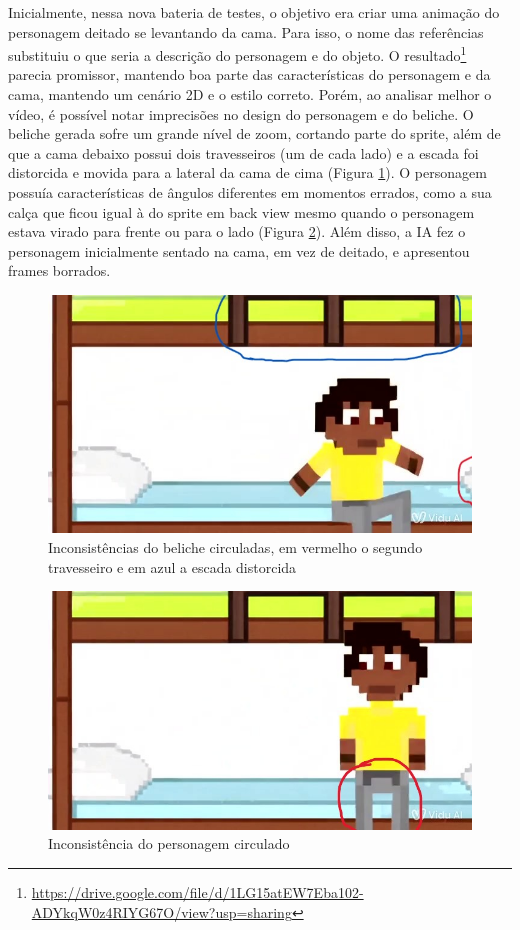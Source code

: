 Inicialmente, nessa nova bateria de testes, o objetivo era criar uma animação do personagem deitado se levantando da cama. Para isso, o nome das referências substituiu o que seria a descrição do personagem e do objeto. O resultado\footnote{\url{https://drive.google.com/file/d/1LG15atEW7Eba102-ADYkqW0z4RIYG67O/view?usp=sharing}} parecia promissor, mantendo boa parte das características do personagem e da cama, mantendo um cenário 2D e o estilo correto. Porém, ao analisar melhor o vídeo, é possível notar imprecisões no design do personagem e do beliche. O beliche gerada sofre um grande nível de zoom, cortando parte do sprite, além de que a cama debaixo possui dois travesseiros (um de cada lado) e a escada foi distorcida e movida para a lateral da cama de cima (Figura \ref{fig:viduErrosCama}). O personagem possuía características de ângulos diferentes em momentos errados, como a sua calça que ficou igual à do sprite em back view mesmo quando o personagem estava virado para frente ou para o lado (Figura \ref{fig:viduErrosPablo}). Além disso, a IA fez o personagem inicialmente sentado na cama, em vez de deitado, e apresentou frames borrados. 

\begin{figure}[htbp]
    \centering
    \caption{\small Inconsistências do beliche circuladas, em vermelho o segundo travesseiro e em azul a escada distorcida}
    \label{fig:viduErrosCama}
    \includegraphics[width=0.7\linewidth]{figs/vidu/errosCama.jpg}
\end{figure}

\begin{figure}[htbp]
    \centering
    \caption{\small Inconsistência do personagem circulado}
    \label{fig:viduErrosPablo}
    \includegraphics[width=0.7\linewidth]{figs/vidu/errosPablo.JPG}
\end{figure}

